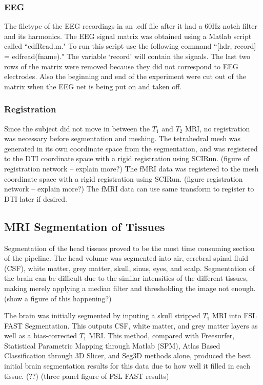 \subsubsection{EEG}

The filetype of the EEG recordings in an .edf file after it had a 60Hz notch filter and its harmonics. The EEG signal matrix was obtained using a Matlab script called ``edfRead.m." To run this script use the following command ``[hdr, record] = edfread(fname)." The variable `record' will contain the signals. The last two rows of the matrix were removed because they did not correspond to EEG electrodes. Also the beginning and end of the experiment were cut out of the matrix when the EEG net is being put on and taken off. 

\subsubsection{Registration}

Since the subject did not move in between the $T_1$ and $T_2$ MRI, no registration was necessary before segmentation and meshing. The tetrahedral mesh was generated in its own coordinate space from the segmentation, and was registered to the DTI coordinate space with a rigid registration using SCIRun. (figure of registration network -- explain more?) The fMRI data was registered to the mesh coordinate space with a rigid registration using SCIRun. (figure registration network -- explain more?) The fMRI data can use same transform to register to DTI later if desired. 

\subsection{MRI Segmentation of Tissues}
\label{sec:Seg}


Segmentation of the head tissues proved to be the most time consuming section of the pipeline. The head volume was segmented into air, cerebral spinal fluid (CSF), white matter, grey matter, skull, sinus, eyes, and scalp. Segmentation of the brain can be difficult due to the similar intensities of the different tissues, making merely applying a median filter and thresholding the image not enough. (show a figure of this happening?)

The brain was initially segmented by inputing a skull stripped $T_1$ MRI into FSL FAST Segmentation. This outputs CSF, white matter, and grey matter layers as well as a bias-corrected $T_1$ MRI. This method, compared with Freesurfer, Statistical Parametric Mapping through Matlab (SPM), Atlas Based Classification through 3D Slicer, and Seg3D methods alone, produced the best initial brain segmentation results for this data due to how well it filled in each tissue. (??) (three panel figure of FSL FAST results)


